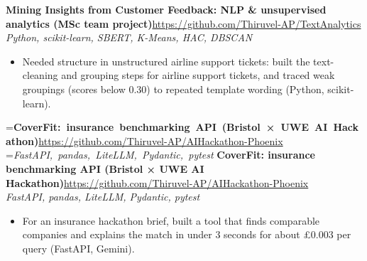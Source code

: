 \documentclass[a4paper,11pt]{article}
\newcommand{\project}[3]{%
  \textbf{#1}\hfill#3\\ {\color{muted}\small\textit{#2}}\par}
\newcommand{\gap}{\vspace{5pt}}
\begin{document}
\ifdim\wd0>\linewidth
\ifdim\wd2>\linewidth
\textbf{Mining Insights from Customer Feedback: NLP \& unsupervised analytics (MSc team project)}\\ {\color{muted}\small\textit{Python, scikit-learn, SBERT, K-Means, HAC, DBSCAN}}\\ \hspace*{\fill}{\small\url{https://github.com/Thiruvel-AP/TextAnalytics}}\par
\else
\textbf{Mining Insights from Customer Feedback: NLP \& unsupervised analytics (MSc team project)}\\ {\color{muted}\small\textit{Python, scikit-learn, SBERT, K-Means, HAC, DBSCAN}}\hfill{\small\url{https://github.com/Thiruvel-AP/TextAnalytics}}\par
\fi
\else
\project{Mining Insights from Customer Feedback: NLP \& unsupervised analytics (MSc team project)}{Python, scikit-learn, SBERT, K-Means, HAC, DBSCAN}{\url{https://github.com/Thiruvel-AP/TextAnalytics}}
\fi
\begin{itemize}
  \item Needed structure in unstructured airline support tickets: built the text-cleaning and grouping steps for airline support tickets, and traced weak groupings (scores below 0.30) to repeated template wording (Python, scikit-learn).
\end{itemize}
\gap
{}
=\hbox{\textbf{CoverFit: insurance benchmarking API (Bristol × UWE AI Hackathon)}\hspace{1em}\url{https://github.com/Thiruvel-AP/AIHackathon-Phoenix}}%
=\hbox{{\small\textit{FastAPI, pandas, LiteLLM, Pydantic, pytest}}}%
\ifdim\wd0>\linewidth
\ifdim\wd2>\linewidth
\textbf{CoverFit: insurance benchmarking API (Bristol × UWE AI Hackathon)}\\ {\color{muted}\small\textit{FastAPI, pandas, LiteLLM, Pydantic, pytest}}\\ \hspace*{\fill}{\small\url{https://github.com/Thiruvel-AP/AIHackathon-Phoenix}}\par
\else
\textbf{CoverFit: insurance benchmarking API (Bristol × UWE AI Hackathon)}\\ {\color{muted}\small\textit{FastAPI, pandas, LiteLLM, Pydantic, pytest}}\hfill{\small\url{https://github.com/Thiruvel-AP/AIHackathon-Phoenix}}\par
\fi
\else
\project{CoverFit: insurance benchmarking API (Bristol × UWE AI Hackathon)}{FastAPI, pandas, LiteLLM, Pydantic, pytest}{\url{https://github.com/Thiruvel-AP/AIHackathon-Phoenix}}
\fi
\begin{itemize}
  \item For an insurance hackathon brief, built a tool that finds comparable companies and explains the match in under 3 seconds for about £0.003 per query (FastAPI, Gemini).
\end{itemize}
\end{document}
